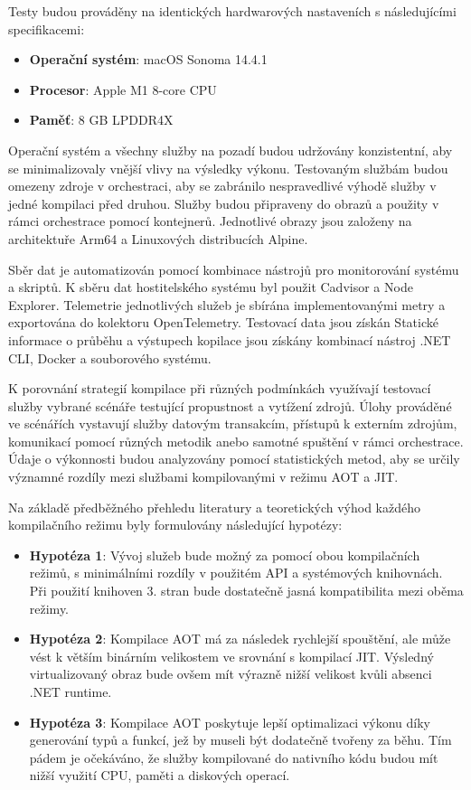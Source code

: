 Testy budou prováděny na identických hardwarových nastaveních s následujícími specifikacemi:

\begin{itemize}
    \item \textbf{Operační systém}: macOS Sonoma 14.4.1
    \item \textbf{Procesor}: Apple M1 8-core CPU
    \item \textbf{Paměť}: 8 GB LPDDR4X
\end{itemize}

Operační systém a všechny služby na pozadí budou udržovány konzistentní, aby se minimalizovaly vnější vlivy na výsledky výkonu. Testovaným službám budou omezeny zdroje v orchestraci, aby se zabránilo nespravedlivé výhodě služby v jedné kompilaci před druhou. Služby budou připraveny do obrazů a použity v rámci orchestrace pomocí kontejnerů. Jednotlivé obrazy jsou založeny na architektuře Arm64 a Linuxových distribucích Alpine.

Sběr dat je automatizován pomocí kombinace nástrojů pro monitorování systému a skriptů. K sběru dat hostitelského systému byl použit Cadvisor a Node Explorer. Telemetrie jednotlivých služeb je sbírána implementovanými metry a exportována do kolektoru OpenTelemetry. Testovací data jsou získán Statické informace o průběhu a výstupech kopilace jsou získány kombinací nástroj .NET CLI, Docker a souborového systému.

K porovnání strategií kompilace při různých podmínkách využívají testovací služby vybrané scénáře testující propustnost a vytížení zdrojů. Úlohy prováděné ve scénářích vystavují služby datovým transakcím, přístupů k externím zdrojům, komunikací pomocí různých metodik anebo samotné spuštění v rámci orchestrace. Údaje o výkonnosti budou analyzovány pomocí statistických metod, aby se určily významné rozdíly mezi službami kompilovanými v režimu AOT a JIT. 


Na základě předběžného přehledu literatury a teoretických výhod každého kompilačního režimu byly formulovány následující hypotézy:

\begin{itemize}
    \item \textbf{Hypotéza 1}: Vývoj služeb bude možný za pomocí obou kompilačních režimů, s minimálními rozdíly v použitém API a systémových knihovnách. Při použití knihoven 3. stran bude dostatečně jasná kompatibilita mezi oběma režimy.
    \item \textbf{Hypotéza 2}: Kompilace AOT má za následek rychlejší spouštění, ale může vést k větším binárním velikostem ve srovnání s kompilací JIT. Výsledný virtualizovaný obraz bude ovšem mít výrazně nižší velikost kvůli absenci .NET runtime.
    \item \textbf{Hypotéza 3}: Kompilace AOT poskytuje lepší optimalizaci výkonu díky generování typů a funkcí, jež by museli být dodatečně tvořeny za běhu. Tím pádem je očekáváno, že služby kompilované do nativního kódu budou mít nižší využití CPU, paměti a diskových operací.
\end{itemize}

